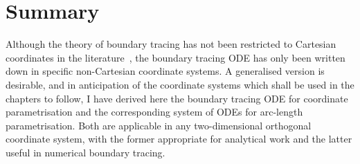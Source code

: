 \section{Summary}
\label{sec:curvilinear.summary}

Although the theory of boundary tracing
has not been restricted to Cartesian coordinates in the literature~\cite{
  anderson-2002-thesis-boundary-tracing-pdes,
  anderson-2007-boundary-tracing-i-theory,
  anderson-2007-boundary-tracing-ii-applications
},
the boundary tracing ODE has only been written down
in specific non-Cartesian coordinate systems.
A generalised version is desirable,
and in anticipation of the coordinate systems
which shall be used in the chapters to follow,
I have derived here the boundary tracing ODE for coordinate parametrisation
and the corresponding system of ODEs for arc-length parametrisation.
Both are applicable in any two-dimensional orthogonal coordinate system,
with the former appropriate for analytical work
and the latter useful in numerical boundary tracing.
